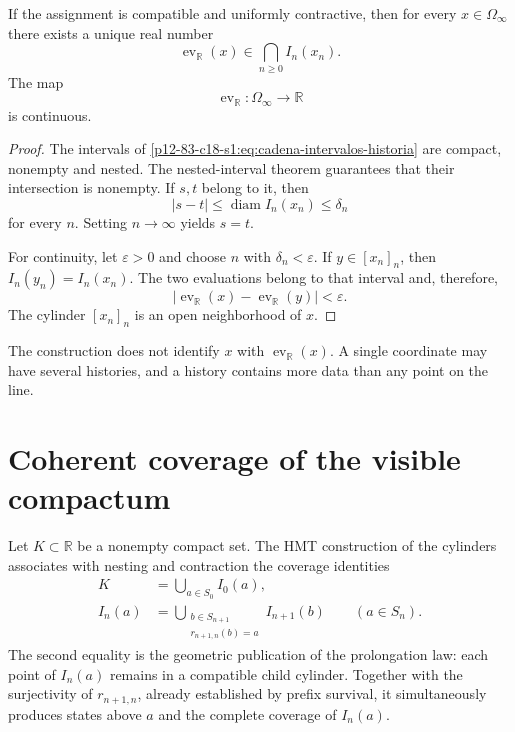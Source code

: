 \begin{theorem}
\label{p12-83-c18-s1:thm:evaluacion-unica-historia-u024}
If the assignment is compatible and uniformly contractive, then for every \(x\in\Omega_\infty\) there exists a unique real number
\begin{equation}
 \operatorname{ev}_{\mathbb R}(x)
 \in\bigcap_{n\geq0}I_n(x_n).
 \label{p12-83-c18-s1:eq:evaluacion-real-historia-u024}
\end{equation}
The map
\begin{equation}
 \operatorname{ev}_{\mathbb R}:\Omega_\infty\longrightarrow\mathbb R
 \label{p12-83-c18-s1:eq:aplicacion-evaluacion-real-u024}
\end{equation}
is continuous.
\end{theorem}

\begin{proof}
The intervals of \eqref{p12-83-c18-s1:eq:cadena-intervalos-historia} are compact,
nonempty and nested. The nested-interval theorem guarantees that
their intersection is nonempty. If \(s,t\) belong to it, then
\[
 |s-t|\leq\operatorname{diam}I_n(x_n)\leq\delta_n
\]
for every \(n\). Setting \(n\to\infty\) yields \(s=t\).

For continuity, let \(\varepsilon>0\) and choose \(n\) with
\(\delta_n<\varepsilon\). If \(y\in[x_n]_n\), then
\(I_n(y_n)=I_n(x_n)\). The two evaluations belong to that interval and,
therefore,
\[
 |\operatorname{ev}_{\mathbb R}(x)
  -\operatorname{ev}_{\mathbb R}(y)|<\varepsilon.
\]
The cylinder \([x_n]_n\) is an open neighborhood of \(x\).
\end{proof}

The construction does not identify \(x\) with
\(\operatorname{ev}_{\mathbb R}(x)\). A single coordinate may have
several histories, and a history contains more data than any point on
the line.

\section{Coherent coverage of the visible compactum}

Let \(K\subset\mathbb R\) be a nonempty compact set. The HMT construction of the
cylinders associates with nesting and contraction the coverage
identities
\begin{align}
 K&=\bigcup_{a\in S_0}I_0(a),
 \label{p12-83-c18-s1:eq:cobertura-inicial-compacto-u024}\\
 I_n(a)&=
 \bigcup_{\substack{b\in S_{n+1}\\r_{n+1,n}(b)=a}}
 I_{n+1}(b)
 \qquad(a\in S_n).
 \label{p12-83-c18-s1:eq:cobertura-extensiones-compatible-u024}
\end{align}
The second equality is the geometric publication of the prolongation law:
each point of \(I_n(a)\) remains in a compatible child cylinder. Together with
the surjectivity of \(r_{n+1,n}\), already established by prefix
survival, it simultaneously produces states above \(a\) and the
complete coverage of \(I_n(a)\).

